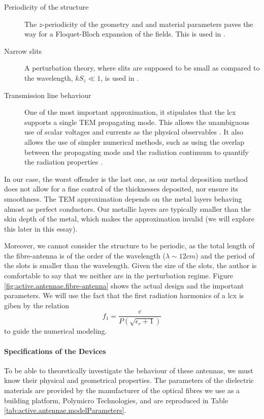 \begin{description}
	\item [Periodicity of the structure] The $z$-periodicity of the geometry and 
		and material parameters paves the way for a Floquet-Bloch expansion of the 
		fields. This is used in \cite{WAN2001}.
	\item [Narrow slits] A perturbation theory, where slits are supposed to be 
			small as compared to the wavelength, $kS_z\ll1$, is used in \cite{KIM2007}.
	\item [Transmission line behaviour] One of the most important approximation, it stipulates
			that the \gls{lcx} supports a single TEM propagating mode. This allows the 
			unambiguous use of scalar voltages and currents as the physical observables
			\cite{PAU2007}. It also allows
			the use of simpler numerical methods, such as using the overlap between the 
			propagating mode and the radiation continuum to quantify the radiation 
			properties \cite{SHI1989,ADD2008}. 
\end{description}

In our case, the worst offender is the last one, as our metal deposition method
does not allow for a fine control of the thicknesses deposited, nor ensure its
smoothness. The TEM approximation depends on the metal layers behaving almost as 
perfect conductors. Our metallic layers are typically smaller than the skin
depth of the metal, which makes the approximation invalid (we will explore
this later in this essay). 

Moreover, we cannot consider the structure to be periodic, as the total 
length of the fibre-antenna is of the order of the wavelength ($\lambda\sim12\unit{cm}$) and the period
of the slots is smaller than the wavelength. Given the size of the slots, 
the author is comfortable to say that we neither are in the perturbation regime. 
Figure \ref{fig:active.antennae.fibre-antenna} shows the actual design and the important parameters.
We will use the fact that the first radiation harmonics of a \gls{lcx} is giben 
by the relation \cite{WAN2001}
	\begin{equation}
		f_1 = \frac{c}{P\left(\sqrt{\epsilon_r+1}\right)}
	\end{equation}
to guide the numerical modeling.

\paragraph{Specifications of the Devices}
To be able to theoretically investigate the behaviour of these antennas, we must
know their physical and geometrical properties. 
The parameters of the dielectric materials are provided by the manufacturer of the
optical fibres we use as a building platform,
Polymicro Technologies, and are reproduced in Table \ref{tab:active.antennae.modelParameters}.

